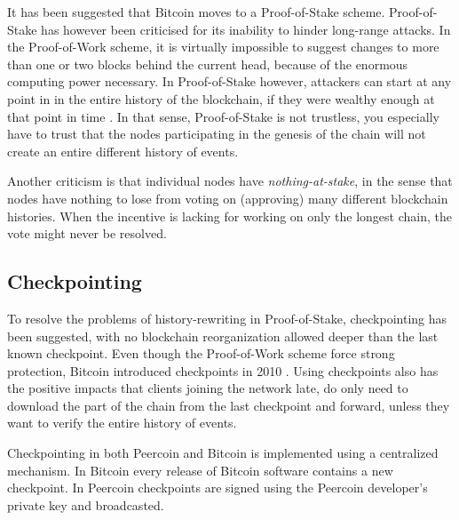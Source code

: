\documentclass[oneside,a4paper,10pts,article]{memoir}
\begin{document}
It has been suggested that Bitcoin moves to a Proof-of-Stake scheme.
Proof-of-Stake has however been criticised for its inability to hinder
long-range attacks. In the Proof-of-Work scheme, it is virtually
impossible to suggest changes to more than one or two blocks behind
the current head, because of the enormous computing power
necessary. In Proof-of-Stake however, attackers can start at any point
in in the entire history of the blockchain, if they were wealthy
enough at that point in time \cite{buterin2014onstake}. In that sense,
Proof-of-Stake is not trustless, you especially have to trust that the
nodes participating in the genesis of the chain will not create an
entire different history of events.

Another criticism is that individual nodes have
\textit{nothing-at-stake}, in the sense that nodes have nothing to
lose from voting on (approving) many different blockchain
histories. When the incentive is lacking for working on only the
longest chain, the vote might never be resolved.

\subsection{Checkpointing}
To resolve the problems of history-rewriting in Proof-of-Stake,
checkpointing has been suggested, with no blockchain reorganization
allowed deeper than the last known checkpoint. Even though the
Proof-of-Work scheme force strong protection, Bitcoin introduced
checkpoints in 2010 \cite{king2012ppcoin}. Using checkpoints also has
the positive impacts that clients joining the network late, do only
need to download the part of the chain from the last checkpoint and
forward, unless they want to verify the entire history of events.

Checkpointing in both Peercoin and Bitcoin is implemented using a
centralized mechanism. In Bitcoin every release of Bitcoin software
contains a new checkpoint. In Peercoin checkpoints are signed using
the Peercoin developer's private key and broadcasted.


\end{document}
